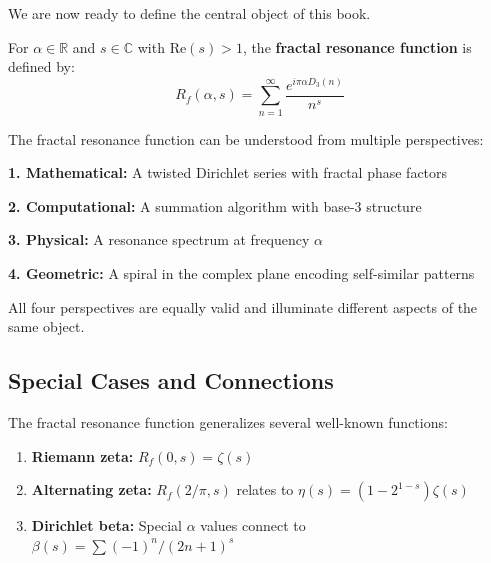 
We are now ready to define the central object of this book.

\begin{definition}
\label{def:fractal-resonance}
For $\alpha \in \mathbb{R}$ and $s \in \mathbb{C}$ with $\text{Re}(s) > 1$, the \textbf{fractal resonance function} is defined by:
\begin{equation}
R_f(\alpha, s) = \sum_{n=1}^{\infty} \frac{e^{i\pi\alpha D_3(n)}}{n^s}
\end{equation}
\end{definition}

\begin{keyidea}
The fractal resonance function can be understood from multiple perspectives:

\textbf{1. Mathematical:} A twisted Dirichlet series with fractal phase factors

\textbf{2. Computational:} A summation algorithm with base-3 structure

\textbf{3. Physical:} A resonance spectrum at frequency $\alpha$

\textbf{4. Geometric:} A spiral in the complex plane encoding self-similar patterns

All four perspectives are equally valid and illuminate different aspects of the same object.
\end{keyidea}

\subsection{Special Cases and Connections}

\begin{proposition}
The fractal resonance function generalizes several well-known functions:
\begin{enumerate}
\item \textbf{Riemann zeta:} $R_f(0, s) = \zeta(s)$
\item \textbf{Alternating zeta:} $R_f(2/\pi, s)$ relates to $\eta(s) = (1-2^{1-s})\zeta(s)$
\item \textbf{Dirichlet beta:} Special $\alpha$ values connect to $\beta(s) = \sum (-1)^n/(2n+1)^s$
\end{enumerate}
\end{proposition}

